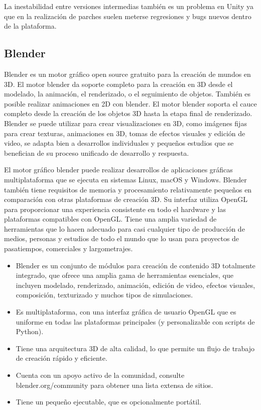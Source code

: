 \documentclass[a4paper, 17pt]{book}
\begin{document}
\vspace{1mm} %

La inestabilidad entre versiones intermedias también es un problema en Unity ya que en la realización de parches suelen
meterse regresiones y bugs nuevos dentro de la plataforma.

\subsection{Blender} 
\label{subsec:Blender}

Blender es un motor gráfico open source gratuito para la creación de mundos en 3D. El motor blender da soporte completo
para la creación en 3D desde el modelado, la animación, el renderizado, o el seguimiento de objetos. También es posible
realizar animaciones en 2D con blender. El motor blender soporta el cauce completo desde la creación de los objetos 3D
hasta la etapa final de renderizado. Blender se puede utilizar para crear visualizaciones en 3D, como imágenes fijas para
crear texturas, animaciones en 3D, tomas de efectos visuales y edición de video, se adapta bien a desarrollos individuales
y pequeños estudios que se benefician de su proceso unificado de desarrollo y respuesta.

\vspace{1mm} %

El motor gráfico blender puede realizar desarrollos de aplicaciones gráficas multiplataforma que se ejecuta en sistemas Linux,
macOS y Windows. Blender también tiene requisitos de memoria y procesamiento relativamente pequeños en comparación con otras
plataformas de creación 3D. Su interfaz utiliza OpenGL para proporcionar una experiencia consistente en todo el hardware
y las plataformas compatibles con OpenGL. Tiene una amplia variedad de herramientas que lo hacen adecuado para casi cualquier
tipo de producción de medios, personas y estudios de todo el mundo que lo usan para proyectos de pasatiempos, comerciales y
largometrajes.


\begin{itemize}
  \item Blender es un conjunto de módulos para creación de contenido 3D totalmente integrado, que ofrece una amplia gama de
  herramientas esenciales, que incluyen modelado, renderizado, animación, edición de video, efectos visuales, composición,
  texturizado y muchos tipos de simulaciones.

  \item Es multiplataforma, con una interfaz gráfica de usuario OpenGL que es uniforme en todas las plataformas principales
  (y personalizable con scripts de Python).

  \item Tiene una arquitectura 3D de alta calidad, lo que permite un flujo de trabajo de creación rápido y eficiente.

  \item Cuenta con un apoyo activo de la comunidad, consulte blender.org/community para obtener una lista extensa de sitios.

  \item Tiene un pequeño ejecutable, que es opcionalmente portátil.
\end{itemize}
\end{document}
